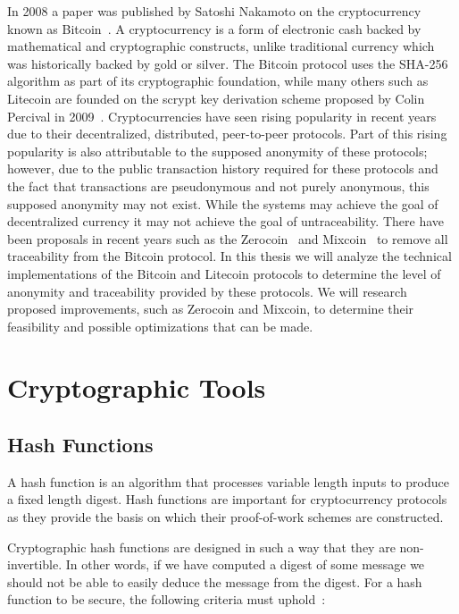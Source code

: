 \documentclass[11pt]{article}
\begin{document}
In 2008 a paper was published by Satoshi Nakamoto on the cryptocurrency known as Bitcoin~\cite{nakamoto08}.
A cryptocurrency is a form of electronic cash backed by mathematical and
cryptographic constructs, unlike traditional currency which was historically
backed by gold or silver. The Bitcoin protocol uses the SHA-256 algorithm as
part of its cryptographic foundation, while many others such as Litecoin are
founded on the scrypt key derivation scheme proposed by Colin Percival in
2009~\cite{percival09}.  Cryptocurrencies have seen rising popularity in recent
years due to their decentralized, distributed, peer-to-peer protocols. Part of
this rising popularity is also attributable to the supposed anonymity of these
protocols; however, due to the public transaction history required for these
protocols and the fact that transactions are pseudonymous and not purely
anonymous, this supposed anonymity may not exist. While the systems may achieve
the goal of decentralized currency it may not achieve the goal of
untraceability. There have been proposals in recent years such as the
Zerocoin~\cite{miers13} and Mixcoin~\cite{bonneau14} to remove all traceability
from the Bitcoin protocol. In this thesis we will analyze the technical
implementations of the Bitcoin and Litecoin protocols to determine the level of
anonymity and traceability provided by these protocols. We will research
proposed improvements, such as Zerocoin and Mixcoin, to determine their
feasibility and possible optimizations that can be made.

\section{Cryptographic Tools}

\subsection{Hash Functions}
A hash function is an algorithm that processes variable length inputs to produce
a fixed length digest. Hash functions are important for cryptocurrency protocols
as they provide the basis on which their proof-of-work schemes are constructed.

Cryptographic hash functions are designed in such a way that they are
non-invertible. In other words, if we have computed a digest of some message we
should not be able to easily deduce the message from the digest. For a hash
function to be secure, the following criteria must uphold~\cite{rogaway04}:
\end{document}
